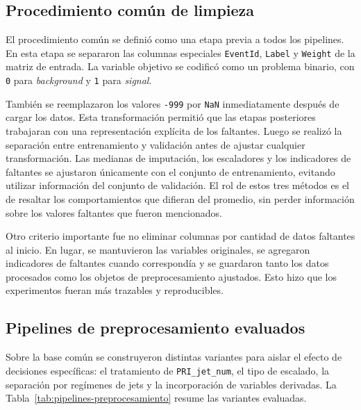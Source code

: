 \documentclass{article}
\begin{document}
\subsection{Procedimiento común de limpieza}
El procedimiento común se definió como una etapa previa a todos los pipelines. En esta etapa se separaron las columnas especiales \texttt{EventId}, \texttt{Label} y \texttt{Weight} de la matriz de entrada. La variable objetivo se codificó como un problema binario, con \texttt{0} para \textit{background} y \texttt{1} para \textit{signal}.

También se reemplazaron los valores \texttt{-999} por \texttt{NaN} inmediatamente después de cargar los datos. Esta transformación permitió que las etapas posteriores trabajaran con una representación explícita de los faltantes. Luego se realizó la separación entre entrenamiento y validación antes de ajustar cualquier transformación. Las medianas de imputación, los escaladores y los indicadores de faltantes se ajustaron únicamente con el conjunto de entrenamiento, evitando utilizar información del conjunto de validación. El rol de estos tres métodos es el de resaltar los comportamientos que difieran del promedio, sin perder información sobre los valores faltantes que fueron mencionados.

Otro criterio importante fue no eliminar columnas por cantidad de datos faltantes al inicio. En lugar, se mantuvieron las variables originales, se agregaron indicadores de faltantes cuando correspondía y se guardaron tanto los datos procesados como los objetos de preprocesamiento ajustados. Esto hizo que los experimentos fueran más trazables y reproducibles.

\subsection{Pipelines de preprocesamiento evaluados}
Sobre la base común se construyeron distintas variantes para aislar el efecto de decisiones específicas: el tratamiento de \texttt{PRI\_jet\_num}, el tipo de escalado, la separación por regímenes de jets y la incorporación de variables derivadas. La Tabla~\ref{tab:pipelines-preprocesamiento} resume las variantes evaluadas.
\end{document}

